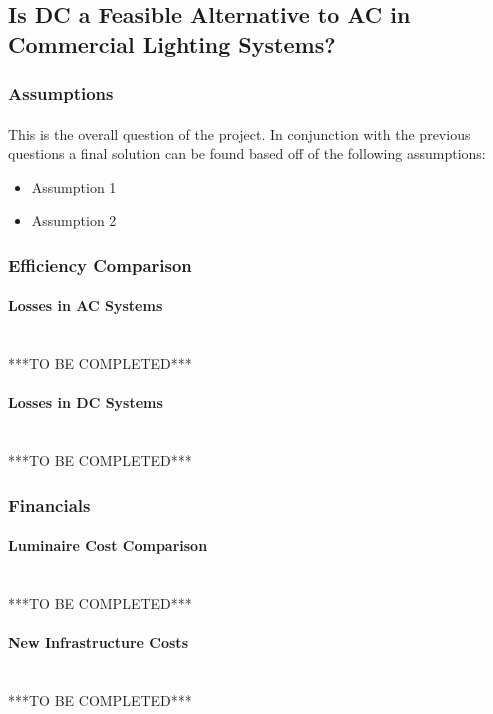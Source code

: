 \subsection{Is DC a Feasible Alternative to AC in Commercial Lighting Systems?}

\subsubsection{Assumptions}
\paragraph{}
This is the overall question of the project. In conjunction with the previous questions a final solution can be found based off of the following assumptions:

\begin{itemize}[noitemsep,nolistsep]
	\item Assumption 1
	\item Assumption 2
\end{itemize}

\subsubsection{Efficiency Comparison}

\paragraph{Losses in AC Systems}
~\\
***TO BE COMPLETED***

\paragraph{Losses in DC Systems}
~\\
***TO BE COMPLETED***

\subsubsection{Financials}

\paragraph{Luminaire Cost Comparison}
~\\
***TO BE COMPLETED***

\paragraph{New Infrastructure Costs}
~\\
***TO BE COMPLETED***

